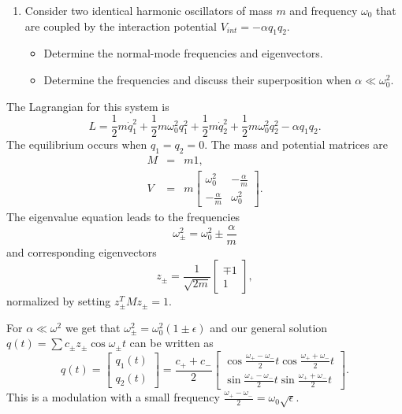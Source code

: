 \documentclass[letterpaper,11pt]{article}
\begin{document}
\begin{enumerate}[resume]
 \item Consider two identical harmonic oscillators of mass $m$ and frequency $\omega_0$ that are coupled by the interaction potential $V_{int} = -\alpha q_1 q_2$.
 \begin{itemize}
  \item Determine the normal-mode frequencies and eigenvectors.
  \item Determine the frequencies and discuss their superposition when $\alpha \ll \omega_0^2$.
 \end{itemize}
\end{enumerate}
The Lagrangian for this system is
\begin{equation*}
 L = \frac{1}{2} m \dot{q}_1^2 + \frac{1}{2} m\omega_0^2 q_1^2 + \frac{1}{2} m \dot{q}_2^2 + \frac{1}{2} m\omega_0^2 q_2^2 - \alpha q_1 q_2.
\end{equation*}
The equilibrium occurs when $q_1 = q_2 = 0$.  The mass and potential matrices are
\begin{eqnarray*}
 M & = & m 1, \\
 V & = & m \left[ \begin{array}{cc}
                   \omega_0^2 & -\frac{\alpha}{m} \\
                   -\frac{\alpha}{m} & \omega_0^2
                  \end{array} \right].
\end{eqnarray*}
The eigenvalue equation leads to the frequencies
\begin{equation*}
 \omega_\pm^2 = \omega_0^2 \pm \frac{\alpha}{m}
\end{equation*}
and corresponding eigenvectors
\begin{equation*}
 z_\pm = \frac{1}{\sqrt{2m}} \left[ \begin{array}{cc} \mp 1 \\ 1 \end{array} \right],
\end{equation*}
normalized by setting $z_\pm^T M z_\pm = 1$.

For $\alpha \ll \omega^2$ we get that $\omega_\pm^2 = \omega_0^2 (1 \pm \epsilon)$ and our general solution $q(t) = \sum c_\pm z_\pm \cos\omega_\pm t$ can be written as
\begin{equation*}
 q(t) = \left[ \begin{array}{cc} q_1(t) \\ q_2(t) \end{array} \right] = \frac{c_+ + c_-}{2} \left[ \begin{array}{cc} \cos\frac{\omega_+ - \omega_-}{2}t \cos\frac{\omega_+ + \omega_-}{2}t \\ \sin\frac{\omega_+ - \omega_-}{2}t \sin\frac{\omega_+ + \omega_-}{2}t \end{array} \right].
\end{equation*}
This is a modulation with a small frequency $\frac{\omega_+ - \omega_-}{2} = \omega_0\sqrt{\epsilon}$.
\end{document}
